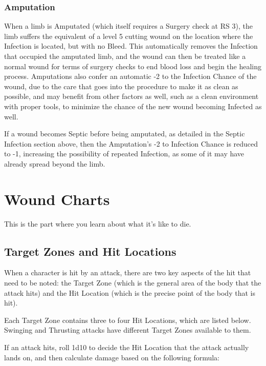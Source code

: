 \documentclass[oneside,11pt,english]{book}
\begin{document}
\subsection{Amputation}
When a limb is Amputated (which itself requires a Surgery check at RS 3), the limb suffers the equivalent 
of a level 5 cutting wound on the location where the Infection is located, but with no Bleed. This 
automatically removes the Infection that occupied the amputated limb, and the wound can then be treated 
like a normal wound for terms of surgery checks to end blood loss and begin the healing process. 
Amputations also confer an automatic -2 to the Infection Chance of the wound, due to the care that goes 
into the procedure to make it as clean as possible, and may benefit from other factors as well, such as a 
clean environment with proper tools, to minimize the chance of the new wound becoming Infected as 
well.

If a wound becomes Septic before being amputated, as detailed in the Septic Infection section above, then 
the Amputation’s -2 to Infection Chance is reduced to -1, increasing the possibility of repeated Infection, 
as some of it may have already spread beyond the limb. 

\chapter{Wound Charts}\label{ch:Damage Tables}
\startcontents[chapters]
\clearpage
\begin{center}
	This is the part where you learn about what it’s like to die.
\end{center}

\section{Target Zones and Hit Locations}
When a character is hit by an attack, there are two key aspects of the hit that need to be noted: the Target 
Zone (which is the general area of the body that the attack hits) and the Hit Location (which is the precise point of the body that is hit).

Each Target Zone contains three to four Hit Locations, which are listed below. Swinging and Thrusting attacks have different Target Zones available to them.

If an attack hits, roll 1d10 to decide the Hit Location that the attack actually lands on, and then calculate 
damage based on the following formula: 
\end{document}
